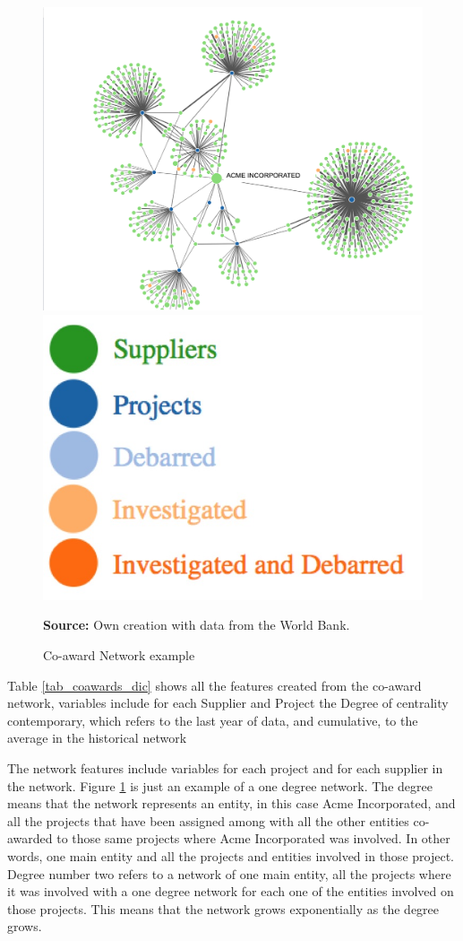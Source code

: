 \begin{figure}[H]
\begin{center}
\caption{Co-award Network example}
\label{fig_network}
\includegraphics[max width=.8\textwidth]{../img/Network-colors.png}
\includegraphics[max width=.19\textwidth]{../img/network-legend.jpg}
\end{center}
\noindent \footnotesize{\textbf{Source:} Own creation with data from the World Bank.}
\end{figure}

Table \ref{tab_coawards_dic} shows all the features created from the co-award network, variables include for each Supplier and Project the Degree of centrality contemporary, which refers to the last year of data, and cumulative, to the average in the historical network



\normalsize
The network features include variables for each project and for each supplier in the network. Figure \ref{fig_network} is just an example of a one degree network. The degree means that the network represents an entity, in this case Acme Incorporated, and all the projects that have been assigned among with all the other entities co-awarded to those same projects where Acme Incorporated was involved. In other words, one main entity and all the projects and entities involved in those project. Degree number two refers to a network of one main entity, all the projects where it was involved with a one degree network for each one of the entities involved on those projects. This means that the network grows exponentially as the degree grows.

